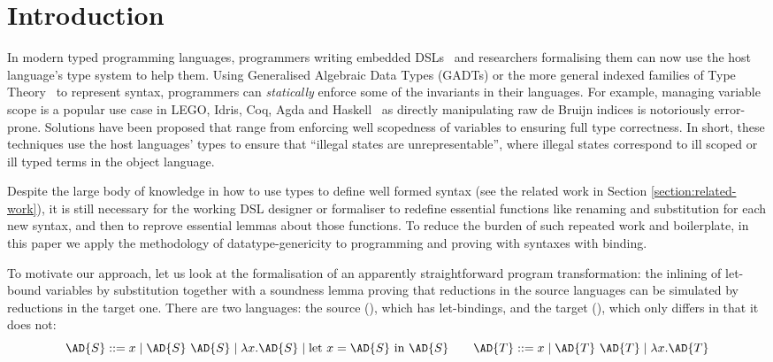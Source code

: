 
\newcommand{\semrec}{\AR{Semantics}}
\newcommand{\semfun}{\AF{semantics}}

\section{Introduction}

In modern typed programming languages, programmers writing embedded
DSLs~\cite{hudak1996building} and researchers formalising them can now
use the host language's type system to help them. Using Generalised
Algebraic Data Types (GADTs) or the more general indexed families of
Type Theory~\cite{dybjer1994inductive} to represent syntax,
programmers can \emph{statically} enforce some of the invariants in
their languages. For example, managing variable scope is a popular use
case in LEGO, Idris, Coq, Agda and
Haskell~\cite{altenkirch1999monadic,DBLP:conf/gpce/BradyH06,DBLP:journals/jar/HirschowitzM12,DBLP:conf/icfp/KeuchelJ12,BachPoulsen,plfa2018,eisenbergsticth18}
as directly manipulating raw de Bruijn indices is notoriously
error-prone. Solutions have been proposed that range from enforcing
well scopedness of variables to ensuring full type correctness. In
short, these techniques use the host languages' types to ensure that
``illegal states are unrepresentable'', where illegal states
correspond to ill scoped or ill typed terms in the object language.

Despite the large body of knowledge in how to use types to define well
formed syntax (see the related work in Section
\ref{section:related-work}), it is still necessary for the working DSL
designer or formaliser to redefine essential functions like renaming
and substitution for each new syntax, and then to reprove essential
lemmas about those functions. To reduce the burden of such repeated
work and boilerplate, in this paper we apply the methodology of
datatype-genericity to programming and proving with syntaxes with
binding.

To motivate our approach, let us look at the formalisation of an
apparently straightforward program transformation: the inlining of
let-bound variables by substitution together with a soundness lemma
proving that reductions in the source languages can be simulated by
reductions in the target one. There are two languages: the source
(), which has let-bindings, and the target (), which only
differs in that it does not:
\begin{displaymath}
  \AD{S} ::= x \mid \AD{S}~\AD{S} \mid \lambda x. \AD{S} \mid \textrm{let }x=\AD{S}\textrm{ in }\AD{S}
  \qquad
  \AD{T} ::= x \mid \AD{T}~\AD{T} \mid \lambda x. \AD{T}
\end{displaymath}

